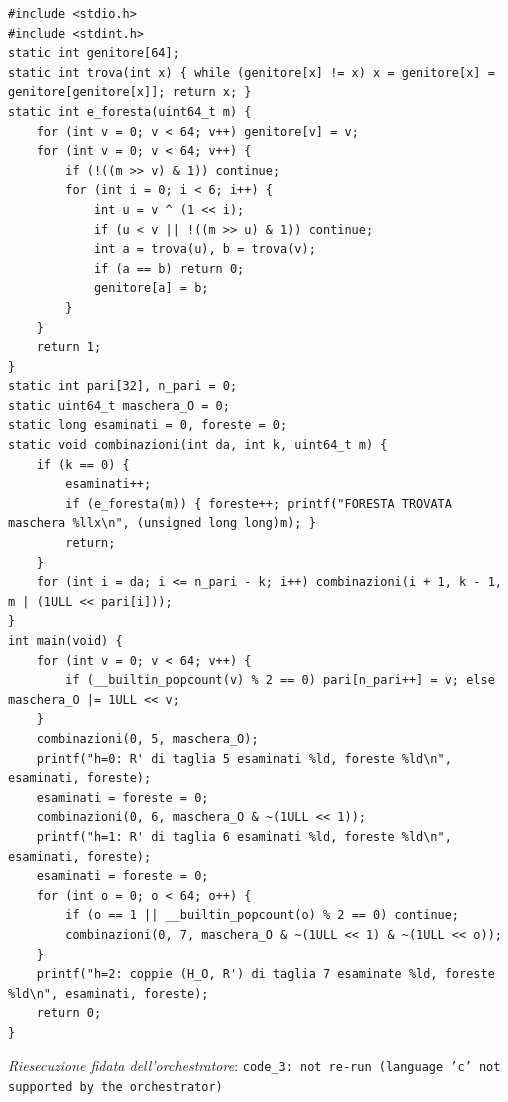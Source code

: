 \documentclass[11pt,a4paper]{article}
\begin{document}
\begin{lstlisting}[caption={attempt\_001 code\_3 [c, rigore exact] — Computation 2 (independent, brute force): refutes (★₀) by testing with union-find every R' — approvato dal Referee}]
#include <stdio.h>
#include <stdint.h>
static int genitore[64];
static int trova(int x) { while (genitore[x] != x) x = genitore[x] = genitore[genitore[x]]; return x; }
static int e_foresta(uint64_t m) {
    for (int v = 0; v < 64; v++) genitore[v] = v;
    for (int v = 0; v < 64; v++) {
        if (!((m >> v) & 1)) continue;
        for (int i = 0; i < 6; i++) {
            int u = v ^ (1 << i);
            if (u < v || !((m >> u) & 1)) continue;
            int a = trova(u), b = trova(v);
            if (a == b) return 0;
            genitore[a] = b;
        }
    }
    return 1;
}
static int pari[32], n_pari = 0;
static uint64_t maschera_O = 0;
static long esaminati = 0, foreste = 0;
static void combinazioni(int da, int k, uint64_t m) {
    if (k == 0) {
        esaminati++;
        if (e_foresta(m)) { foreste++; printf("FORESTA TROVATA maschera %llx\n", (unsigned long long)m); }
        return;
    }
    for (int i = da; i <= n_pari - k; i++) combinazioni(i + 1, k - 1, m | (1ULL << pari[i]));
}
int main(void) {
    for (int v = 0; v < 64; v++) {
        if (__builtin_popcount(v) % 2 == 0) pari[n_pari++] = v; else maschera_O |= 1ULL << v;
    }
    combinazioni(0, 5, maschera_O);
    printf("h=0: R' di taglia 5 esaminati %ld, foreste %ld\n", esaminati, foreste);
    esaminati = foreste = 0;
    combinazioni(0, 6, maschera_O & ~(1ULL << 1));
    printf("h=1: R' di taglia 6 esaminati %ld, foreste %ld\n", esaminati, foreste);
    esaminati = foreste = 0;
    for (int o = 0; o < 64; o++) {
        if (o == 1 || __builtin_popcount(o) % 2 == 0) continue;
        combinazioni(0, 7, maschera_O & ~(1ULL << 1) & ~(1ULL << o));
    }
    printf("h=2: coppie (H_O, R') di taglia 7 esaminate %ld, foreste %ld\n", esaminati, foreste);
    return 0;
}

\end{lstlisting}
\noindent\emph{Riesecuzione fidata dell'orchestratore}: \texttt{code\_3: not re-run (language 'c' not supported by the orchestrator)}
\end{document}
